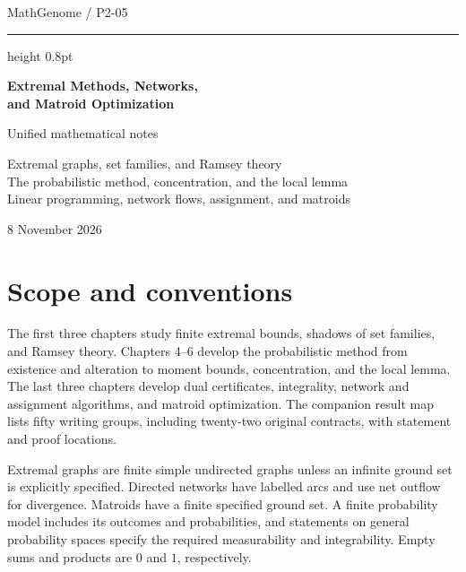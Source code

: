 \documentclass[11pt,oneside,openany]{book}
\theoremstyle{plain}
\theoremstyle{definition}
\theoremstyle{remark}
\begin{document}
\frontmatter
\hypersetup{pageanchor=false}
\begin{titlepage}
\thispagestyle{empty}
\vspace*{27mm}
{\large MathGenome \enspace / \enspace P2-05\par}
\vspace{8mm}
\hrule height 0.8pt
\vspace{11mm}
{\Huge\bfseries Extremal Methods, Networks,\\[3pt]
and Matroid Optimization\par}
\vspace{12mm}
{\large Unified mathematical notes\par}
\vspace{6mm}
{\normalsize Extremal graphs, set families, and Ramsey theory\\
The probabilistic method, concentration, and the local lemma\\
Linear programming, network flows, assignment, and matroids\par}
\vfill
{\large 8 November 2026\par}
\end{titlepage}
\hypersetup{pageanchor=true}
\begingroup
\small
\setlength{\baselineskip}{10.6pt}
\tableofcontents
\endgroup

\chapter*{Scope and conventions}
The first three chapters study finite extremal bounds, shadows of
set families, and Ramsey theory. Chapters 4--6 develop the probabilistic
method from existence and alteration to moment bounds, concentration,
and the local lemma. The last three chapters develop dual certificates,
integrality, network and assignment algorithms, and matroid
optimization. The companion result map lists fifty writing groups,
including twenty-two original contracts, with statement and proof
locations.

Extremal graphs are finite simple undirected graphs unless an infinite
ground set is explicitly specified. Directed networks have labelled
arcs and use net outflow for divergence. Matroids have a finite
specified ground set. A finite probability model includes its
outcomes and probabilities, and statements on general probability
spaces specify the required measurability and integrability. Empty
sums and products are \(0\) and \(1\), respectively.
\end{document}
